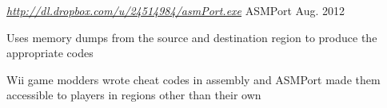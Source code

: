 \begin{cventries}
\iffalse
  \cventry
  {\textit{\url{https://github.com/SupaStuff/audioConvert/} } }
    {AudioConvert}
    {Dec. 2013 - Mar. 2014}
    {}
    {
      \begin{cvitems}
        \item {Converts digital audio files between various formats}
        \item {The user can specify what properties to use for naming the output file}
        \item {Submitted for the Honors Enrichment Component project}
      \end{cvitems}
    }
\fi

\iffalse
  \cventry
  {\textit{\url{http://supastuff.github.io/modcodegen/} } }
    {Modcodegen}
    {Nov. 2012}
    {}
    {
      \begin{cvitems}
        \item {Simplifies the use of the weapon modifier codes for Monster Hunter Tri}
        \item {Populates the dropdown boxes with text extracted from a memory dump of the game using JavaScript}
        \item {The YouTube video under “Weapons” demonstrates a roller code used to see all of the sharpness levels}
      \end{cvitems}
    }
\fi

\iftrue
  \cventry
  {\textit{\url{http://dl.dropbox.com/u/24514984/asmPort.exe} } }
    {ASMPort}
    {Aug. 2012}
    {}
    {
      \begin{cvitems}
        \item {Uses memory dumps from the source and destination region to produce the appropriate codes}
        \item {Wii game modders wrote cheat codes in assembly and ASMPort made them accessible to players in regions other than their own}
      \end{cvitems}
    }
\fi

\end{cventries}
